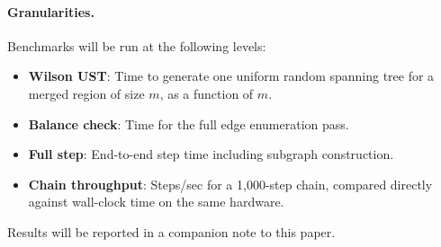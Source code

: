 \paragraph{Granularities.}
Benchmarks will be run at the following levels:
\begin{itemize}
  \item \textbf{Wilson UST}: Time to generate one uniform random spanning
    tree for a merged region of size $m$, as a function of $m$.
  \item \textbf{Balance check}: Time for the full edge enumeration pass.
  \item \textbf{Full step}: End-to-end \recom{} step time including
    subgraph construction.
  \item \textbf{Chain throughput}: Steps/sec for a 1{,}000-step chain,
    compared directly against \gc{} wall-clock time on the same hardware.
\end{itemize}

Results will be reported in a companion note to this paper.
